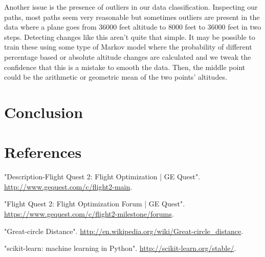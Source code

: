 \documentclass{article}[12pt]
\begin{document}
\begin{multicols}{2}
Another issue is the presence of outliers in our data classification. Inspecting our paths, most paths seem very reasonable but sometimes outliers are present in the data where a plane goes from 36000 feet altitude to 8000 feet to 36000 feet in two steps. Detecting changes like this aren't quite that simple. It may be possible to train these using some type of Markov model where the probability of different percentage based or absolute altitude changes are calculated and we tweak the confidence that this is a mistake to smooth the data. Then, the middle point could be the arithmetic or geometric mean of the two points' altitudes.

\section{Conclusion}

\section{References}
\begin{thebibliography}{1}

 "Description-Flight Quest 2: Flight Optimization | GE Quest". \url{http://www.gequest.com/c/flight2-main}.

 "Flight Quest 2: Flight Optimization Forum | GE Quest". \url{https://www.gequest.com/c/flight2-milestone/forums}.

 "Great-circle Distance". \url{http://en.wikipedia.org/wiki/Great-circle_distance}.

 "scikit-learn: machine learning in Python". \url{http://scikit-learn.org/stable/}.

\end{thebibliography}
\end{multicols}
\end{document}
